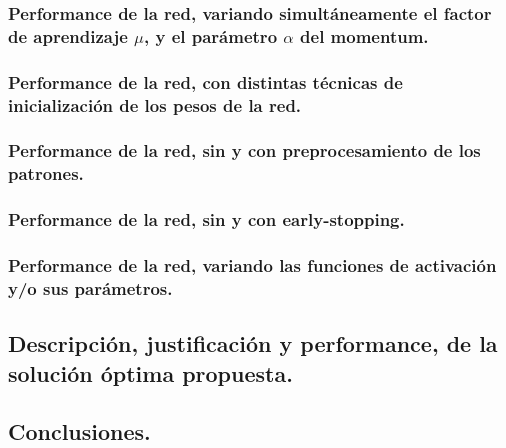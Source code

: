 \subsubsection{Performance de la red, variando simultáneamente el factor de aprendizaje $\mu$, y el parámetro $\alpha$ del momentum.}

\subsubsection{Performance de la red, con distintas técnicas de inicialización de los pesos de la red.}

\subsubsection{Performance de la red, sin y con preprocesamiento de los patrones.}

\subsubsection{Performance de la red, sin y con early-stopping.}

\subsubsection{Performance de la red, variando las funciones de activación y/o sus parámetros.}


\subsection{Descripción, justificación y performance, de la solución óptima propuesta.}


\subsection{Conclusiones.}